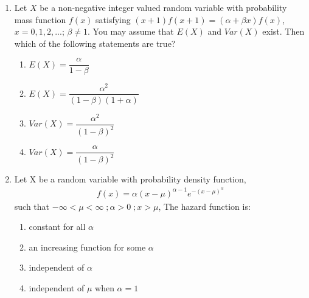 \renewcommand{\theequation}{\theenumi}
\renewcommand{\thefigure}{\theenumi}
\renewcommand{\thetable}{\theenumi}
\begin{enumerate}[label=\thesection.\arabic*.,ref=\thesection.\theenumi]
%
\item Let $X$ be a non-negative integer valued random variable with probability mass function $f(x)$ satisfying $(x+1)f(x+1)=(\alpha + \beta x)f(x)$, $x=0,1,2,...$; $\beta \neq 1$. You may assume that $E(X)$ and $Var(X)$ exist. Then which of the following statements are true?

\begin{enumerate}
    \item $E(X)=\dfrac{\alpha}{1-\beta}$ \vspace{0.2cm}
    \item $E(X)=\dfrac{\alpha^2}{(1-\beta)(1+\alpha)}$ \vspace{0.2cm}
    \item $Var(X)=\dfrac{\alpha^2}{(1-\beta)^2}$ \vspace{0.2cm}
    \item $Var(X)=\dfrac{\alpha}{(1-\beta)^2}$
\end{enumerate}
%
\solution

%
\item Let X be a random variable with probability density function,
\begin{align}
    f(x)=\alpha(x-\mu)^{\alpha-1}e^{-(x-\mu)^{\alpha}}
\end{align}
such that $-\infty<\mu<\infty\;;\alpha>0\;;x>\mu$, The hazard function is: 
\begin{enumerate}
    \item constant for all $\alpha$
    \item an increasing function for some $\alpha$
    \item independent of $\alpha$
    \item independent of $\mu$ when $\alpha=1$
\end{enumerate}
%
\solution


\end{enumerate}
